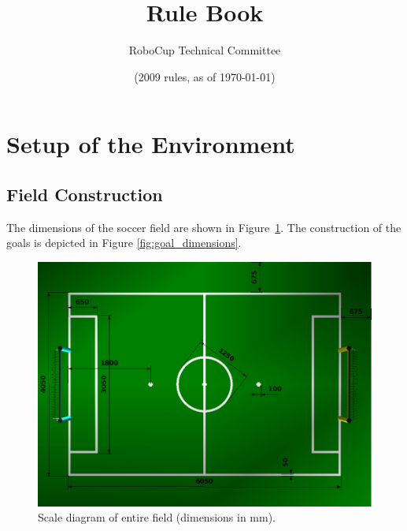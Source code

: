 \documentclass[12pt]{article}
\title{\leaguename Rule Book}
\author{RoboCup Technical Committee}
\date{(2009 rules, as of \today)}
\begin{document}
\maketitle

\vfill

\tableofcontents
\setcounter{tocdepth}{3}

\thispagestyle{fancy}

\clearpage

\cfoot{\thepage}
\setcounter{page}{1}

\section{Setup of the Environment}

\subsection{Field Construction}

The dimensions of the soccer field are shown in
Figure~\ref{fig:field_dim}. The construction of the goals is depicted in Figure \ref{fig:goal_dimensions}.

\begin{figure}[b!]
\centerline{\includegraphics[width=\columnwidth]{figs/fieldDimensions2009.png}}
\caption{Scale diagram of entire field (dimensions in mm).} \label{fig:field_dim}
\end{figure}


\end{document}
